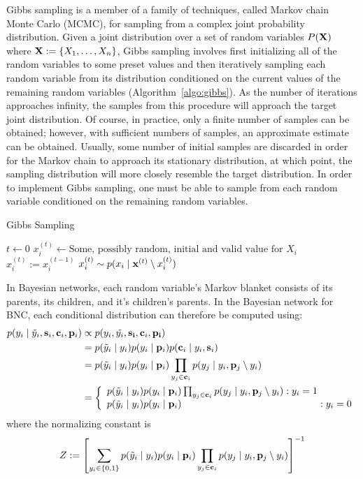 Gibbs sampling is a member of a family of techniques, called Markov chain Monte Carlo (MCMC), for sampling from a complex joint probability distribution. Given a joint distribution over a set of random variables $P(\bold{X})$ where $\bold{X} := \{X_1, \dots, X_n\}$, Gibbs sampling involves first initializing all of the random variables to some preset values and then iteratively sampling each random variable from its distribution conditioned on the current values of the remaining random variables (Algorithm~\ref{algo:gibbs}). As the number of iterations approaches infinity, the samples from this procedure will approach the target joint distribution. Of course, in practice, only a finite number of samples can be obtained; however, with sufficient numbers of samples, an approximate estimate can be obtained. Usually, some number of initial samples are discarded in order for the Markov chain to approach its stationary distribution, at which point, the sampling distribution will more closely resemble the target distribution. In order to implement Gibbs sampling, one must be able to sample from each random variable conditioned on the remaining random variables.

\begin{algorithm}
\caption{Gibbs Sampling}
\label{algo:gibbs}
\begin{algorithmic}
\State $t \gets 0$
	\State $x_i^{(t)} \gets \text{Some, possibly random, initial and valid value for } X_i$
\EndFor
{}
		\State $x_i^{(t)} := x_i^{(t-1)}$
	\EndFor
		\State $x_i^{(t)} \sim p(x_i \mid \bold{x}^{(t)} \setminus x_i^{(t)})$
	\EndFor
\EndFor
\end{algorithmic}
\end{algorithm}

In Bayesian networks, each random variable's Markov blanket consists of its parents, its children, and it's children's parents. In the Bayesian network for BNC, each conditional distribution can therefore be computed using:
\begin{align*}
p(y_i \mid \tilde{y}_i, \bold{s}_i, \bold{c}_i, \bold{p}_i) &\propto p(y_i, \tilde{y_i}, \bold{s_i}, \bold{c}_i, \bold{p_i}) \\
&= p(\tilde{y}_i \mid y_i) p(y_i \mid \bold{p}_i) p(\bold{c}_i \mid y_i, \bold{s}_i)  \\
&= p(\tilde{y}_i \mid y_i) p(y_i \mid  \bold{p}_i)  \prod_{y_j \in \bold{c}_i} p(y_j \mid y_i, \bold{p}_j \setminus y_i)\\
&=  \left\{
     \begin{array}{lr}
       p(\tilde{y}_i \mid y_i) p(y_i \mid  \bold{p}_i)  \prod_{y_j \in \bold{c}_i} p(y_j \mid y_i, \bold{p}_j \setminus y_i)  : y_i = 1  \\
       p(\tilde{y}_i \mid y_i) p(y_i \mid  \bold{p}_i)  \ \ \ \ \ \ \ \ \ \ \ \ \ \ \ \ \ \ \ \ \ \ \ \ \ \ \ \ \ \  \ \ \ \ \ \ \ \ \ \ \ \ : y_i = 0
     \end{array}
   \right.
\end{align*}
where the normalizing constant is
$$Z := \left[\sum_{y_i \in \{0,1\}} p(\tilde{y}_i \mid y_i) p(y_i \mid  \bold{p}_i) \prod_{y_j \in \bold{c}_i} p(y_j \mid y_i, \bold{p}_j \setminus y_i) \right]^{-1}$$


